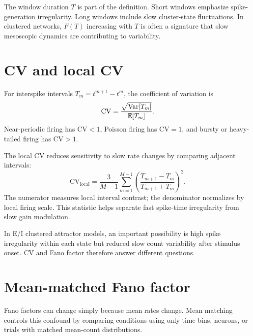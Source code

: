 The window duration $T$ is part of the definition. Short windows emphasize spike-generation irregularity. Long windows include slow cluster-state fluctuations. In clustered networks, $F(T)$ increasing with $T$ is often a signature that slow mesoscopic dynamics are contributing to variability.

\section{CV and local CV}
\label{sec:cv-local-cv}

For interspike intervals $T_m=t^{m+1}-t^m$, the coefficient of variation is
%
\begin{equation}
  \mathrm{CV} =
  \frac{\sqrt{\operatorname{Var}[T_m]}}{\mathbb{E}[T_m]}.
  \label{eq:isi-cv-measurement}
\end{equation}
%
Near-periodic firing has $\mathrm{CV}<1$, Poisson firing has $\mathrm{CV}=1$, and bursty or heavy-tailed firing has $\mathrm{CV}>1$.

The local CV reduces sensitivity to slow rate changes by comparing adjacent intervals:
%
\begin{equation}
  \mathrm{CV}_{\mathrm{local}}
  =
  \frac{3}{M-1}\sum_{m=1}^{M-1}
  \left(
  \frac{T_{m+1}-T_m}{T_{m+1}+T_m}
  \right)^2.
  \label{eq:local-cv}
\end{equation}
%
The numerator measures local interval contrast; the denominator normalizes by local firing scale. This statistic helps separate fast spike-time irregularity from slow gain modulation.

In E/I clustered attractor models, an important possibility is high spike irregularity within each state but reduced slow count variability after stimulus onset. CV and Fano factor therefore answer different questions.

\section{Mean-matched Fano factor}
\label{sec:mean-matched-fano}

Fano factors can change simply because mean rates change. Mean matching controls this confound by comparing conditions using only time bins, neurons, or trials with matched mean-count distributions.

